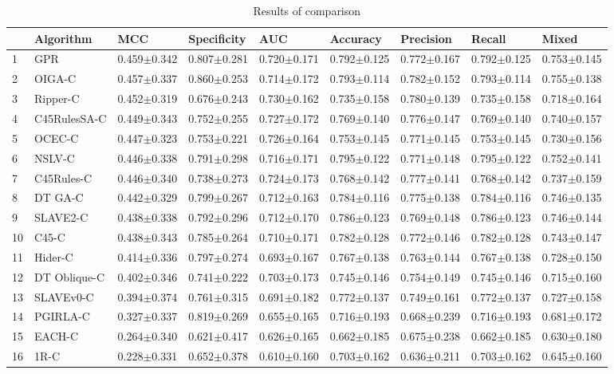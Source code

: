 \begin{table}
\footnotesize
\caption{Results of comparison}
\label{tab:comparison}
\begin{tabular}{lllllllll}
\hline
 & Algorithm & MCC & Specificity & AUC & Accuracy & Precision & Recall & Mixed \\
\hline
1 & GPR & 0.459$\pm$0.342 & 0.807$\pm$0.281 & 0.720$\pm$0.171 & 0.792$\pm$0.125 & 0.772$\pm$0.167 & 0.792$\pm$0.125 & 0.753$\pm$0.145 \\
2 & OIGA-C & 0.457$\pm$0.337 & 0.860$\pm$0.253 & 0.714$\pm$0.172 & 0.793$\pm$0.114 & 0.782$\pm$0.152 & 0.793$\pm$0.114 & 0.755$\pm$0.138 \\
3 & Ripper-C & 0.452$\pm$0.319 & 0.676$\pm$0.243 & 0.730$\pm$0.162 & 0.735$\pm$0.158 & 0.780$\pm$0.139 & 0.735$\pm$0.158 & 0.718$\pm$0.164 \\
4 & C45RulesSA-C & 0.449$\pm$0.343 & 0.752$\pm$0.255 & 0.727$\pm$0.172 & 0.769$\pm$0.140 & 0.776$\pm$0.147 & 0.769$\pm$0.140 & 0.740$\pm$0.157 \\
5 & OCEC-C & 0.447$\pm$0.323 & 0.753$\pm$0.221 & 0.726$\pm$0.164 & 0.753$\pm$0.145 & 0.771$\pm$0.145 & 0.753$\pm$0.145 & 0.730$\pm$0.156 \\
6 & NSLV-C & 0.446$\pm$0.338 & 0.791$\pm$0.298 & 0.716$\pm$0.171 & 0.795$\pm$0.122 & 0.771$\pm$0.148 & 0.795$\pm$0.122 & 0.752$\pm$0.141 \\
7 & C45Rules-C & 0.446$\pm$0.340 & 0.738$\pm$0.273 & 0.724$\pm$0.173 & 0.768$\pm$0.142 & 0.777$\pm$0.141 & 0.768$\pm$0.142 & 0.737$\pm$0.159 \\
8 & DT GA-C & 0.442$\pm$0.329 & 0.799$\pm$0.267 & 0.712$\pm$0.163 & 0.784$\pm$0.116 & 0.775$\pm$0.138 & 0.784$\pm$0.116 & 0.746$\pm$0.135 \\
9 & SLAVE2-C & 0.438$\pm$0.338 & 0.792$\pm$0.296 & 0.712$\pm$0.170 & 0.786$\pm$0.123 & 0.769$\pm$0.148 & 0.786$\pm$0.123 & 0.746$\pm$0.144 \\
10 & C45-C & 0.438$\pm$0.343 & 0.785$\pm$0.264 & 0.710$\pm$0.171 & 0.782$\pm$0.128 & 0.772$\pm$0.146 & 0.782$\pm$0.128 & 0.743$\pm$0.147 \\
11 & Hider-C & 0.414$\pm$0.336 & 0.797$\pm$0.274 & 0.693$\pm$0.167 & 0.767$\pm$0.138 & 0.763$\pm$0.144 & 0.767$\pm$0.138 & 0.728$\pm$0.150 \\
12 & DT Oblique-C & 0.402$\pm$0.346 & 0.741$\pm$0.222 & 0.703$\pm$0.173 & 0.745$\pm$0.146 & 0.754$\pm$0.149 & 0.745$\pm$0.146 & 0.715$\pm$0.160 \\
13 & SLAVEv0-C & 0.394$\pm$0.374 & 0.761$\pm$0.315 & 0.691$\pm$0.182 & 0.772$\pm$0.137 & 0.749$\pm$0.161 & 0.772$\pm$0.137 & 0.727$\pm$0.158 \\
14 & PGIRLA-C & 0.327$\pm$0.337 & 0.819$\pm$0.269 & 0.655$\pm$0.165 & 0.716$\pm$0.193 & 0.668$\pm$0.239 & 0.716$\pm$0.193 & 0.681$\pm$0.172 \\
15 & EACH-C & 0.264$\pm$0.340 & 0.621$\pm$0.417 & 0.626$\pm$0.165 & 0.662$\pm$0.185 & 0.675$\pm$0.238 & 0.662$\pm$0.185 & 0.630$\pm$0.180 \\
16 & 1R-C & 0.228$\pm$0.331 & 0.652$\pm$0.378 & 0.610$\pm$0.160 & 0.703$\pm$0.162 & 0.636$\pm$0.211 & 0.703$\pm$0.162 & 0.645$\pm$0.160 \\
\hline
\end{tabular}
\end{table}
